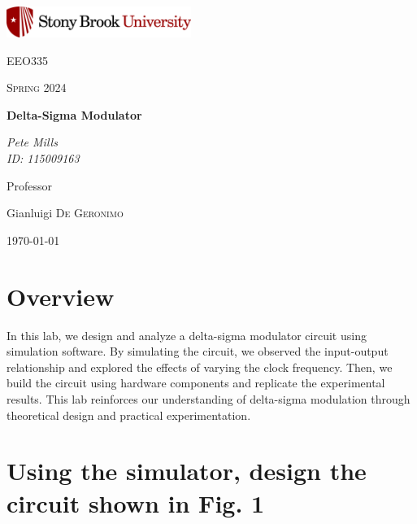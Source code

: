 \documentclass{article}
\begin{document}
	
\begin{titlepage}
	\centering
	\includegraphics[width=0.45\textwidth]{sbu}\par\vspace{1cm}
	{\LARGE \textsc{EEO335}\par}
	\vspace{1cm}
	{\Large \textsc{Spring 2024}\par}
	\vspace{1.5cm}
	{\huge\bfseries Delta-Sigma Modulator\par}
	\vspace{2cm}
	{\Large\itshape Pete Mills\\ID: 115009163\par}
	\vfill
	Professor\par
	Gianluigi \textsc{De Geronimo}

	\vfill

	{\large \today\par}
\end{titlepage}

	\newcommand{\assName}{Assignment 9-1.pdf}

	
	
	

	\section*{Overview}
	
	In this lab, we design and analyze a delta-sigma modulator circuit using simulation software. By simulating the circuit, we observed the input-output relationship and explored the effects of varying the clock frequency. Then, we build the circuit using hardware components and replicate the experimental results. This lab reinforces our understanding of delta-sigma modulation through theoretical design and practical experimentation.
	
	\section{Using the simulator, design the circuit shown in Fig. 1}
\end{document}
